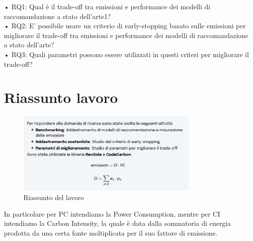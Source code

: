\documentclass[12pt]{article}
\begin{document}
• RQ1: Qual è il trade-off tra emissioni e performance dei modelli di raccomandazione a stato dell’arte1?\\
• RQ2: E’ possibile usare un criterio di early-stopping basato sulle emissioni per migliorare il trade-off tra emissioni e performance dei modelli di raccomandazione a stato dell’arte?\\
• RQ3: Quali parametri possono essere utilizzati in questi criteri per migliorare il trade-off?
\section{Riassunto lavoro}
\begin{figure}[H]
    \centering
    \includegraphics[width=0.8\textwidth]{image.png}
    \caption{Riassunto del lavoro}
    \label{fig:riassunto}
\end{figure}
In particolare per PC intendiamo la Power Consumption, mentre per CI intendiamo la Carbon Intensity, la quale è data dalla sommatoria di energia prodotta da una certa fonte moltiplicata per il suo fattore di emissione.\\
\end{document}
